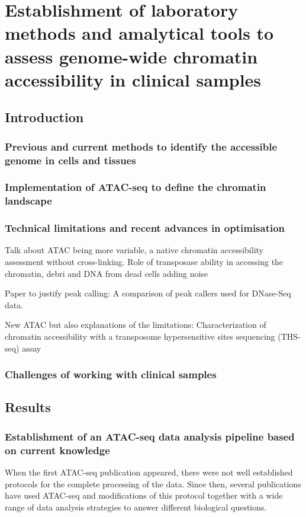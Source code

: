 \chapter{Establishment of laboratory methods and amalytical tools to assess genome-wide chromatin accessibility in clinical samples}
\label{ch:Results_1}


\section{Introduction}
\subsection*{Previous and current methods to identify the accessible genome in cells and tissues}

\subsection*{Implementation of ATAC-seq to define the chromatin landscape}

\subsection*{Technical limitations and recent advances in optimisation}

Talk about ATAC being more variable, a native chromatin accessibility assessment without cross-linking. Role of transposase ability in accessing the chromatin, debri and DNA from dead cells adding noise

Paper to justify peak calling: A comparison of peak callers used for DNase-Seq data.

New ATAC but also explanations of the limitations: Characterization of chromatin accessibility with a transposome hypersensitive sites sequencing (THS-seq) assay

\subsection*{Challenges of working with clinical samples}

\section{Results}
%

\subsection*{Establishment of an ATAC-seq data analysis pipeline based on current knowledge}
When the first ATAC-seq publication \parencite{Buenrostro2013} appeared, there were not well established protocols for the complete processing of the data. Since then, several publications have used ATAC-seq and modifications of this protocol together with a wide range of data analysis strategies to answer different biological questions. %

